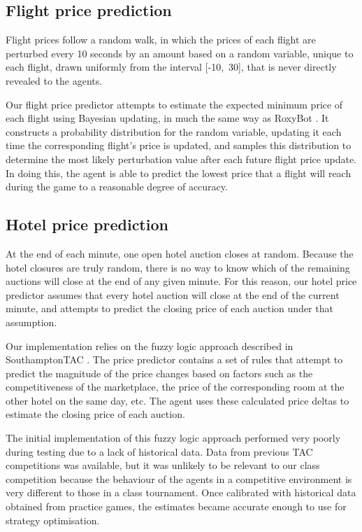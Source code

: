 \documentclass[a4paper]{proc}
\begin{document}
\subsection{Flight price prediction}

Flight prices follow a random walk, in which the prices of each flight are perturbed every 10 seconds by an amount based on a random variable, unique to each flight, drawn uniformly from the interval \mbox{[-10, 30]}, that is never directly revealed to the agents.

Our flight price predictor attempts to estimate the expected minimum price of each flight using Bayesian updating, in much the same way as Roxy\-Bot \cite{RoxyBot}. It constructs a probability distribution for the random variable, updating it each time the corresponding flight's price is updated, and samples this distribution to determine the most likely perturbation value after each future flight price update. In doing this, the agent is able to predict the lowest price that a flight will reach during the game to a reasonable degree of accuracy.

\subsection{Hotel price prediction}

At the end of each minute, one open hotel auction closes at random. Because the hotel closures are truly random, there is no way to know which of the remaining auctions will close at the end of any given minute. For this reason, our hotel price predictor assumes that every hotel auction will close at the end of the current minute, and attempts to predict the closing price of each auction under that assumption.

Our implementation relies on the fuzzy logic approach described in SouthamptonTAC \cite{SouthamptonTAC}. The price predictor contains a set of rules that attempt to predict the magnitude of the price changes based on factors such as the competitiveness of the marketplace, the price of the corresponding room at the other hotel on the same day, etc. The agent uses these calculated price deltas to estimate the closing price of each auction.

The initial implementation of this fuzzy logic approach performed very poorly during testing due to a lack of historical data. Data from previous TAC competitions was available, but it was unlikely to be relevant to our class competition because the behaviour of the agents in a competitive environment is very different to those in a class tournament. Once calibrated with historical data obtained from practice games, the estimates became accurate enough to use for strategy optimisation.
\end{document}
